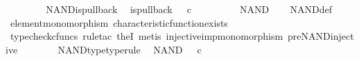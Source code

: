 \begin{isabellebody}
\ \ \ \ \isamarkupfalse%
\isanewline
\ \ \isamarkupfalse%
\isanewline
{}\isamarkupfalse%
%
\endisatagproof
{\isafoldproof}%
%
\isadelimproof
\isanewline
%
\endisadelimproof
\isanewline
{}\isamarkupfalse%
\ NAND{\isacharunderscore}{\kern0pt}is{\isacharunderscore}{\kern0pt}pullback{\isacharcolon}{\kern0pt}\isanewline
\ \ {\isachardoublequoteopen}is{\isacharunderscore}{\kern0pt}pullback\ {\isacharparenleft}{\kern0pt}{\isasymone}{\isasymCoprod}{\isacharparenleft}{\kern0pt}{\isasymone}{\isasymCoprod}{\isasymone}{\isacharparenright}{\kern0pt}{\isacharparenright}{\kern0pt}\ {\isasymone}\ {\isacharparenleft}{\kern0pt}{\isasymOmega}{\isasymtimes}\isactrlsub c{\isasymOmega}{\isacharparenright}{\kern0pt}\ {\isasymOmega}\ {\isacharparenleft}{\kern0pt}{\isasymbeta}\isactrlbsub {\isacharparenleft}{\kern0pt}{\isasymone}{\isasymCoprod}{\isacharparenleft}{\kern0pt}{\isasymone}{\isasymCoprod}{\isasymone}{\isacharparenright}{\kern0pt}{\isacharparenright}{\kern0pt}\isactrlesub {\isacharparenright}{\kern0pt}\ {\isasymt}\ {\isacharparenleft}{\kern0pt}{\isasymlangle}{\isasymf}{\isacharcomma}{\kern0pt}\ {\isasymf}{\isasymrangle}{\isasymamalg}\ {\isacharparenleft}{\kern0pt}{\isasymlangle}{\isasymt}{\isacharcomma}{\kern0pt}\ {\isasymf}{\isasymrangle}\ {\isasymamalg}{\isasymlangle}{\isasymf}{\isacharcomma}{\kern0pt}\ {\isasymt}{\isasymrangle}{\isacharparenright}{\kern0pt}{\isacharparenright}{\kern0pt}\ NAND{\isachardoublequoteclose}\isanewline
%
\isadelimproof
\ \ %
\endisadelimproof
%
\isatagproof
{}\isamarkupfalse%
\ NAND{\isacharunderscore}{\kern0pt}def\isanewline
\ \ \isamarkupfalse%
\ element{\isacharunderscore}{\kern0pt}monomorphism\ characteristic{\isacharunderscore}{\kern0pt}function{\isacharunderscore}{\kern0pt}exists\isanewline
\ \ \isamarkupfalse%
\ {\isacharparenleft}{\kern0pt}typecheck{\isacharunderscore}{\kern0pt}cfuncs{\isacharcomma}{\kern0pt}\ rule{\isacharunderscore}{\kern0pt}tac\ the{}I{}{\isacharcomma}{\kern0pt}\ metis\ injective{\isacharunderscore}{\kern0pt}imp{\isacharunderscore}{\kern0pt}monomorphism\ pre{\isacharunderscore}{\kern0pt}NAND{\isacharunderscore}{\kern0pt}injective{\isacharparenright}{\kern0pt}%
\endisatagproof
{\isafoldproof}%
%
\isadelimproof
\isanewline
%
\endisadelimproof
\ \ \ \ \ \ \isanewline
{}\isamarkupfalse%
\ NAND{\isacharunderscore}{\kern0pt}type{\isacharbrackleft}{\kern0pt}type{\isacharunderscore}{\kern0pt}rule{\isacharbrackright}{\kern0pt}{\isacharcolon}{\kern0pt}\isanewline
\ \ {\isachardoublequoteopen}NAND\ {\isacharcolon}{\kern0pt}\ {\isasymOmega}\ {\isasymtimes}\isactrlsub c\ {\isasymOmega}\ {\isasymrightarrow}\ {\isasymOmega}{\isachardoublequoteclose}\isanewline

\end{isabellebody}
